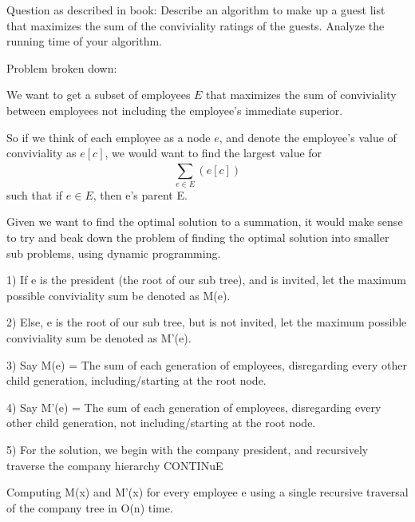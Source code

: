 \documentclass{article}
\begin{document}
Question as described in book: Describe an algorithm to make up a guest list that maximizes the sum of the conviviality ratings of the guests. Analyze the running time of your algorithm.

Problem broken down: 

We want to get a subset of employees $E$ that maximizes the sum of conviviality between employees not including the employee's immediate superior.

So if we think of each employee as a node $e$, and denote the employee's value of conviviality as $e[c]$, we would want to find the largest value for $$\sum_{e \in E}^{}(e[c])$$ such that if $e \in E$, then e's parent \notin E.


Given we want to find the optimal solution to a summation, it would make sense to try and beak down the problem of finding the optimal solution into smaller sub problems, using dynamic programming.

1) If e is the president (the root of our sub tree), and is invited, let the maximum possible conviviality sum be denoted as M(e).

2) Else, e is the root of our sub tree, but is not invited, let the maximum possible conviviality sum be denoted as M'(e).

3) Say M(e) = The sum of each generation of employees, disregarding every other child generation, including/starting at the root node.

4) Say M'(e) = The sum of each generation of employees, disregarding every other child generation, not including/starting at the root node.

5) For the solution, we begin with the company president, and recursively traverse the company hierarchy  CONTINuE


Computing M(x) and M'(x) for every employee e using a single recursive traversal of the company tree in O(n) time.
\end{document}
